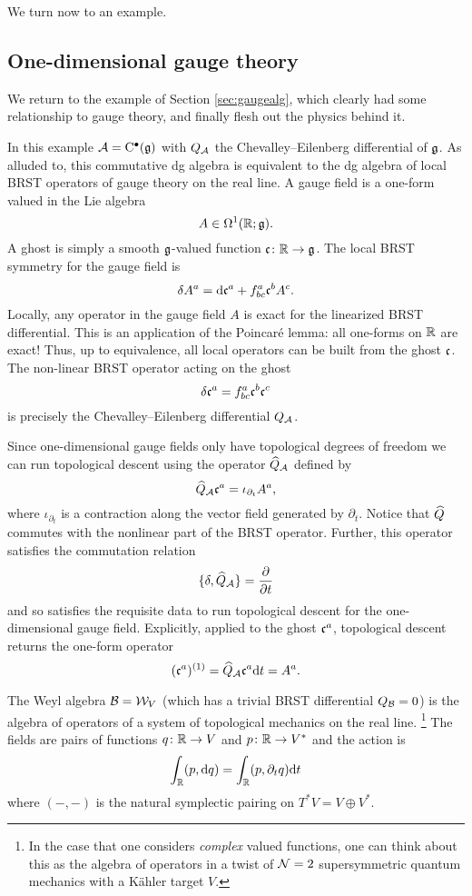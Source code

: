 \documentclass[11pt]{amsart}
\begin{document}
We turn now to an example. 

\subsection{One-dimensional gauge theory}
\label{sec:gaugetheory}

We return to the example of Section \ref{sec:gaugealg}, which clearly had some relationship to gauge theory, and finally flesh out the physics behind it. 

In this example $\cA = \clie^\bu(\fg)$ with $Q_{\cA}$ the Chevalley--Eilenberg differential of $\fg$.
As alluded to, this commutative dg algebra is equivalent to the dg algebra of local BRST operators of gauge theory on the real line. 
A gauge field is a one-form valued in the Lie algebra
\[
A \in \Omega^1(\RR ; \fg) .
\]
A ghost is simply a smooth $\fg$-valued function $\fc \colon \RR \to \fg$. 
The local BRST symmetry for the gauge field is
\[
\delta A^a = \d \fc^a + f_{bc}^a \fc^b A^c .
\]
Locally, any operator in the gauge field $A$ is exact for the linearized BRST differential. This is an application of the Poincar\'e lemma: all one-forms on $\RR$ are exact!
Thus, up to equivalence, all local operators can be built from the ghost $\fc$. 
The non-linear BRST operator acting on the ghost 
\[
\delta \fc^a = f_{bc}^a \fc^b \fc^c 
\]
is precisely the Chevalley--Eilenberg differential $Q_\cA$.

Since one-dimensional gauge fields only have topological degrees of freedom we can run topological descent using the operator $\Hat{Q}_\cA$ defined by
\[
\Hat{Q}_\cA \fc^a = \iota_{\partial_t} A^a ,
\] where $ \iota_{\partial_t}$ is a contraction along the vector field generated by $\partial_t$. 
Notice that $\Hat{Q}$ commutes with the nonlinear part of the BRST operator. 
Further, this operator satisfies the commutation relation 
\[
\{\delta , \Hat{Q}_\cA\} = \frac{\partial}{\partial t} 
\]
and so satisfies the requisite data to run topological descent for the one-dimensional gauge field. 
Explicitly, applied to the ghost $\fc^a$, topological descent returns the one-form operator 
\[
(\fc^a)^{(1)} = \Hat{Q}_\cA \fc^a \d t = A^a  .
\]

The Weyl algebra $\cB = \cW_V$ (which has a trivial BRST differential $Q_{\cB} = 0$) is the algebra of operators of a system of topological mechanics on the real line. \footnote{In the case that one considers {\em complex} valued functions, one can think about this as the algebra of operators in a twist of $\cN=2$ supersymmetric quantum mechanics with a K\"ahler target $V$.}
The fields are pairs of functions $q  \colon \RR \to V$ and $p \colon \RR \to V^*$ and the action is 
\[
\int_\RR (p,\d q) = \int_\RR (p , \partial_t q) \d t 
\]
where $(-,-)$ is the natural symplectic pairing on $T^* V = V \oplus V^*$. 
\end{document}
